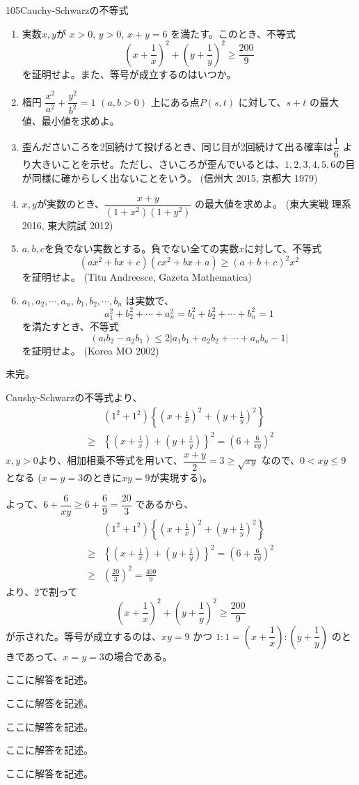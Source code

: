 \begin{thm}{105}{}{Cauchy-Schwarzの不等式}
 \begin{enumerate}
  \item 実数$x, y$が $x>0$, $y>0$, $x+y=6$ を満たす。このとき、不等式
	\[ \left(x+\frac{1}{x}\right)^2+\left(y+\frac{1}{y}\right)^2 \geq \frac{200}{9}	\]
	を証明せよ。また、等号が成立するのはいつか。
  \item 楕円 $\dfrac{x^2}{a^2}+\dfrac{y^2}{b^2}=1$ $(a, b>0)$ 上にある点$P(s,t)$ に対して、$s+t$ の最大値、最小値を求めよ。
  \item 歪んださいころを2回続けて投げるとき、同じ目が2回続けて出る確率は$\dfrac{1}{6}$ より大きいことを示せ。ただし、さいころが歪んでいるとは、$1, 2, 3, 4, 5, 6$の目が同様に確からしく出ないことをいう。 (信州大 2015, 京都大 1979)
  \item $x, y$が実数のとき、$\dfrac{x+y}{(1+x^2)(1+y^2)}$ の最大値を求めよ。 (東大実戦 理系 2016, 東大院試 2012)
  \item $a, b, c$を負でない実数とする。負でない全ての実数$x$に対して、不等式
	\[ (ax^2+bx+c)(cx^2+bx+a)\ge (a+b+c)^2 x^2 \]
	を証明せよ。 (Titu Andreesce, Gazeta Mathematica)
  \item $a_1, a_2, \cdots, a_n$, $b_1, b_2, \cdots, b_n$ は実数で、
	\[ a_1^2+b_2^2+\cdots +a_n^2=b_1^2+b_2^2+\cdots +b_n^2=1 \]
	を満たすとき、不等式
	\[ (a_!b_2-a_2b_1) \le 2\left|a_1b_1+a_2b_2+\cdots +a_nb_n -1 \right| \]
	を証明せよ。 (Korea MO 2002)
 \end{enumerate}
\end{thm}

未完。

Caushy-Schwarzの不等式より、
\begin{align*}
 &(1^2+1^2)\left\{\left(x+\frac{1}{x}\right)^2+\left(y+\frac{1}{y}\right)^2\right\} \\
 \geq &\left\{\left(x+\frac{1}{x}\right)+\left(y+\frac{1}{y}\right)\right\}^2 = \left(6+\frac{6}{xy}\right)^2
\end{align*}
$x, y > 0$より、相加相乗不等式を用いて、$\dfrac{x+y}{2}=3\geq\sqrt{xy}$ なので、$0<xy\leq 9$ となる ($x=y=3$のときに$xy=9$が実現する)。

よって、$6+\dfrac{6}{xy}\geq 6+\dfrac{6}{9}=\dfrac{20}{3}$ であるから、
\begin{align*}
 &(1^2+1^2)\left\{\left(x+\frac{1}{x}\right)^2+\left(y+\frac{1}{y}\right)^2\right\} \\
 \geq &\left\{\left(x+\frac{1}{x}\right)+\left(y+\frac{1}{y}\right)\right\}^2 = \left(6+\frac{6}{xy}\right)^2 \\
 \geq &\left(\frac{20}{3}\right)^2=\frac{400}{9}
\end{align*}
より、2で割って
\[ \left(x+\frac{1}{x}\right)^2+\left(y+\frac{1}{y}\right)^2 \geq \frac{200}{9} \]
が示された。等号が成立するのは、$xy=9$ かつ $1:1=\left(x+\dfrac{1}{x}\right):\left(y+\dfrac{1}{y}\right)$ のときであって、$x=y=3$の場合である。

ここに解答を記述。

ここに解答を記述。

ここに解答を記述。

ここに解答を記述。

ここに解答を記述。
